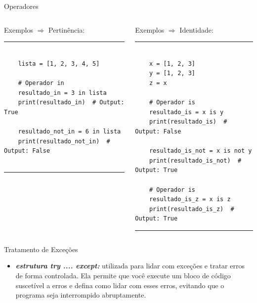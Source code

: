 \documentclass{beamer}
\begin{document}
\begin{frame}[fragile]{Operadores}
	
	\label{operadores_pertinencia_exemplos}
	\begin{columns}
		\begin{column}{0.5\textwidth}
			Exemplos $\Rightarrow$ Pertinência:
			\rule{\textwidth}{1pt}
			\scriptsize
			\begin{verbatim}
				
	lista = [1, 2, 3, 4, 5]
	
	# Operador in
	resultado_in = 3 in lista
	print(resultado_in)  # Output: True
	
	resultado_not_in = 6 in lista
	print(resultado_not_in)  # Output: False
				
			\end{verbatim}
			\rule{\textwidth}{1pt}
		\end{column}
		\begin{column}{0.5\textwidth}
			Exemplos $\Rightarrow$ Identidade:
			
			\rule{\textwidth}{1pt}
			\scriptsize
			\begin{verbatim}
				
	x = [1, 2, 3]
	y = [1, 2, 3]
	z = x
	
	# Operador is
	resultado_is = x is y
	print(resultado_is)  # Output: False
	
	resultado_is_not = x is not y
	print(resultado_is_not)  # Output: True
	
	# Operador is
	resultado_is_z = x is z
	print(resultado_is_z)  # Output: True

			\end{verbatim}
			
			\rule{\textwidth}{1pt}
		\end{column}
	\end{columns}
\end{frame}



\begin{frame}[fragile]{Tratamento de Exceções}
	\label{tratamento_de_excecoes}
	\begin{itemize}
		\item  \textbf{\textit{estrutura try .... except:}} utilizada para lidar com exceções e tratar erros de forma controlada. Ela permite que você execute um bloco de código suscetível a erros e defina como lidar com esses erros, evitando que o programa seja interrompido abruptamente. 
	\end{itemize}
\end{frame}
\end{document}

